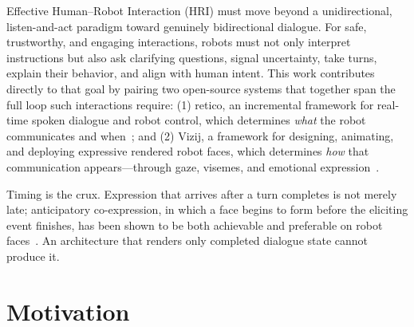 \documentclass[conference]{IEEEtran}
\begin{document}
%
Effective Human–Robot Interaction (HRI) must move beyond a unidirectional, listen-and-act paradigm toward genuinely bidirectional dialogue. For safe, trustworthy, and engaging interactions, robots must not only interpret instructions but also ask clarifying questions, signal uncertainty, take turns, explain their behavior, and align with human intent. This work contributes directly to that goal by pairing two open-source systems that together span the full loop such interactions require: (1) retico, an incremental framework for real-time spoken dialogue and robot control, which determines \textit{what} the robot communicates and when~\cite{michael2020retico}; and (2) Vizij, a framework for designing, animating, and deploying expressive rendered robot faces, which determines \textit{how} that communication appears—through gaze, visemes, and emotional expression~\cite{elbeleidy2026vizij,elbeleidy2026tutorial}.

%
Timing is the crux. Expression that arrives after a turn completes is not
merely late; anticipatory co-expression, in which a face begins to form
before the eliciting event finishes, has been shown to be both achievable
and preferable on robot faces~\cite{coexpression2024}. An architecture that
renders only completed dialogue state cannot produce it.

\section{Motivation}
\end{document}
